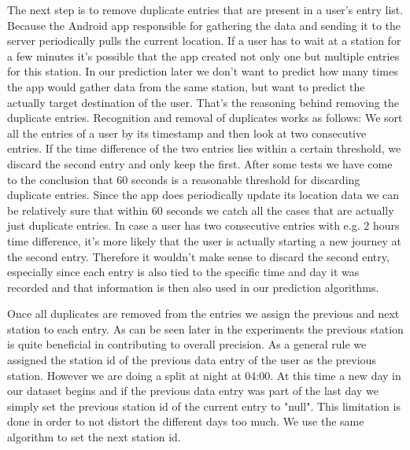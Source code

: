 The next step is to remove duplicate entries that are present in a user's entry list. Because the Android app responsible for gathering the data and sending it to the server periodically pulls the current location. If a user has to wait at a station for a few minutes it's possible that the app created not only one but multiple entries for this station. In our prediction later we don't want to predict how many times the app would gather data from the same station, but want to predict the actually target destination of the user. That's the reasoning behind removing the duplicate entries. Recognition and removal of duplicates works as follows: We sort all the entries of a user by its timestamp and then look at two consecutive entries. If the time difference of the two entries lies within a certain threshold, we discard the second entry and only keep the first. After some tests we have come to the conclusion that 60 seconds is a reasonable threshold for discarding duplicate entries. Since the app does periodically update its location data we can be relatively sure that within 60 seconds we catch all the cases that are actually just duplicate entries. In case a user has two consecutive entries with e.g. 2 hours time difference, it's more likely that the user is actually starting a new journey at the second entry. Therefore it wouldn't make sense to discard the second entry, especially since each entry is also tied to the specific time and day it was recorded and that information is then also used in our prediction algorithms.

Once all duplicates are removed from the entries we assign the previous and next station to each entry. As can be seen later in the experiments the previous station is quite beneficial in contributing to overall precision. As a general rule we assigned the station id of the previous data entry of the user as the previous station. However we are doing a split at night at 04:00. At this time a new day in our dataset begins and if the previous data entry was part of the last day we simply set the previous station id of the current entry to "null". This limitation is done in order to not distort the different days too much. We use the same algorithm to set the next station id.

